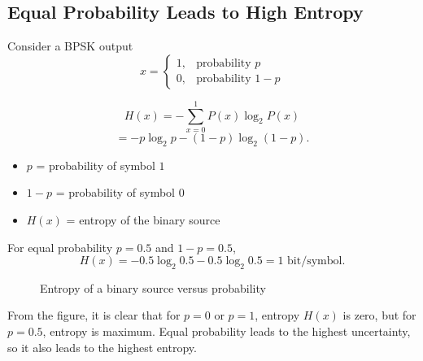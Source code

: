 \documentclass[11pt,a4paper]{book}
\begin{document}
\clearpage

\subsection{Equal Probability Leads to High Entropy}

Consider a BPSK output
\[
x =
\begin{cases}
1, & \text{probability } p \\
0, & \text{probability } 1-p
\end{cases}
\]

\[
H(x) = -\sum_{x=0}^{1} P(x)\log_2 P(x)
\]
\[
= -p\log_2 p - (1-p)\log_2(1-p).
\]
\begin{itemize}
    \item $p$ = probability of symbol $1$
    \item $1-p$ = probability of symbol $0$
    \item $H(x)$ = entropy of the binary source
\end{itemize}

For equal probability $p=0.5$ and $1-p=0.5$,
\[
H(x) = -0.5\log_2 0.5 - 0.5\log_2 0.5 = 1 \text{ bit/symbol.}
\]

\begin{figure}[H]
    \centering
    \caption{Entropy of a binary source versus probability}
\end{figure}

From the figure, it is clear that for $p=0$ or $p=1$, entropy $H(x)$ is zero, but for $p=0.5$, entropy is maximum. Equal probability leads to the highest uncertainty, so it also leads to the highest entropy.
\end{document}
